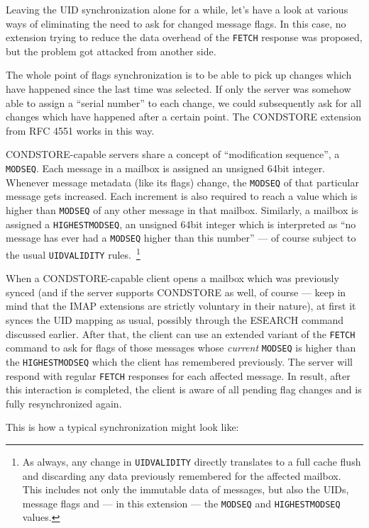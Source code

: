 \documentclass[trojita]{subfiles}
\begin{document}
Leaving the UID synchronization alone for a while, let's have a look at various ways of eliminating the need to ask for
changed message flags.  In this case, no extension trying to reduce the data overhead of the {\tt FETCH} response was
proposed, but the problem got attacked from another side.

The whole point of flags synchronization is to be able to pick up changes which have happened since the last time was
selected.  If only the server was somehow able to assign a ``serial number'' to each change, we could subsequently ask
for all changes which have happened after a certain point.  The CONDSTORE extension from RFC 4551 \cite{rfc4551} works
in this way.

CONDSTORE-capable servers share a concept of ``modification sequence'', a {\tt MODSEQ}.  Each message in a mailbox is
assigned an unsigned 64bit integer.  Whenever message metadata (like its flags) change, the {\tt MODSEQ} of that
particular message gets increased.  Each increment is also required to reach a value which is higher than {\tt MODSEQ}
of any other message in that mailbox.  Similarly, a mailbox is assigned a {\tt HIGHESTMODSEQ}, an unsigned 64bit integer
which is interpreted as ``no message has ever had a {\tt MODSEQ} higher than this number'' --- of course subject to the
usual {\tt UIDVALIDITY} rules.~\footnote{As always, any change in {\tt UIDVALIDITY} directly translates to a full cache
flush and discarding any data previously remembered for the affected mailbox.  This includes not only the immutable data
of messages, but also the UIDs, message flags and --- in this extension --- the {\tt MODSEQ} and {\tt HIGHESTMODSEQ}
values.}

When a CONDSTORE-capable client opens a mailbox which was previously synced (and if the server supports CONDSTORE as
well, of course --- keep in mind that the IMAP extensions are strictly voluntary in their nature), at first it synces the
UID mapping as usual, possibly through the ESEARCH command discussed earlier.  After that, the client can use an
extended variant of the {\tt FETCH} command to ask for flags of those messages whose {\em current} {\tt MODSEQ} is
higher than the {\tt HIGHESTMODSEQ} which the client has remembered previously.  The server will respond with regular
{\tt FETCH} responses for each affected message.  In result, after this interaction is completed, the client is aware of
all pending flag changes and is fully resynchronized again.

This is how a typical synchronization might look like:
\end{document}
